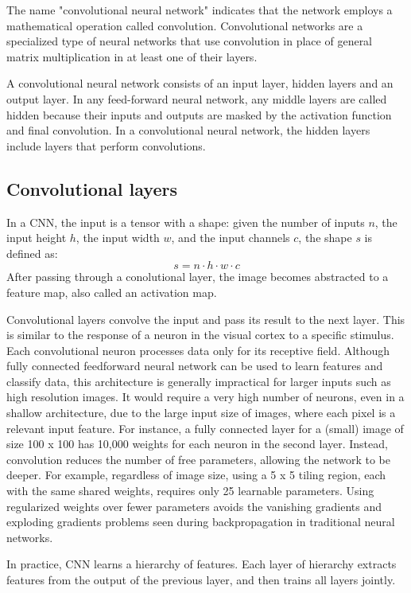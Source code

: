 The name "convolutional neural network" indicates that the network employs a mathematical operation called convolution. Convolutional networks are a specialized type of neural networks that use convolution in place of general matrix multiplication in at least one of their layers.

A convolutional neural network consists of an input layer, hidden layers and an output layer. In any feed-forward neural network, any middle layers are called hidden because their inputs and outputs are masked by the activation function and final convolution. In a convolutional neural network, the hidden layers include layers that perform convolutions.

\subsection{Convolutional layers}
In a CNN, the input is a tensor with a shape: given the number of inputs \(n\), the input height \(h\), the input width \(w\), and the input channels \(c\), the shape \(s\) is defined as:
\begin{equation}
    s = n \cdot h \cdot w \cdot c
\end{equation}
After passing through a conolutional layer, the image becomes abstracted to a feature map, also called an activation map.

Convolutional layers convolve the input and pass its result to the next layer. This is similar to the response of a neuron in the visual cortex to a specific stimulus. Each convolutional neuron processes data only for its receptive field. Although fully connected feedforward neural network can be used to learn features and classify data, this architecture is generally impractical for larger inputs such as high resolution images. It would require a very high number of neurons, even in a shallow architecture, due to the large input size of images, where each pixel is a relevant input feature. For instance, a fully connected layer for a (small) image of size 100 x 100 has 10,000 weights for each neuron in the second layer. Instead, convolution reduces the number of free parameters, allowing the network to be deeper. For example, regardless of image size, using a 5 x 5 tiling region, each with the same shared weights, requires only 25 learnable parameters. Using regularized weights over fewer parameters avoids the vanishing gradients and exploding gradients problems seen during backpropagation in traditional neural networks.

In practice, CNN learns a hierarchy of features. Each layer of hierarchy extracts features from the output of the previous layer, and then trains all layers jointly.

